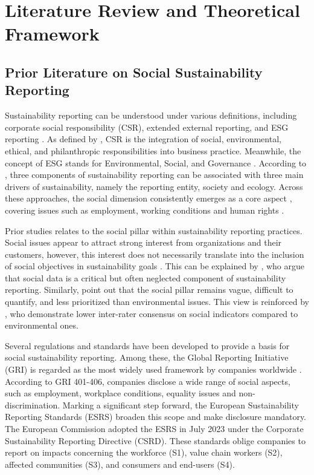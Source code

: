 \chapter{Literature Review and Theoretical Framework}
\label{chap:background}
\section{Prior Literature on Social Sustainability Reporting}

Sustainability reporting can be understood under various definitions, 
including corporate social responsibility (CSR), extended external reporting, 
and ESG reporting \parencite{Edge2022}. As defined by \parencite{Rasche2017}, CSR is the integration of social, 
environmental, ethical, and philanthropic responsibilities into business practice. 
Meanwhile, the concept of ESG stands for Environmental, Social, and Governance \parencite{UNGlobal2004}.
According to \parencite{Krivogorsky2024}, three components of sustainability reporting 
can be associated with three main drivers of sustainability, namely the reporting entity, 
society and ecology. Across these approaches, the social dimension consistently emerges 
as a core aspect \parencite{Rasche2017, UNGlobal2024, Krivogorsky2024}, covering issues 
such as employment, working conditions and human rights \parencite{Fiechter2022, Morais2018}.

Prior studies relates to the social pillar within sustainability reporting practices. Social issues 
appear to attract strong interest from organizations and their customers, however, this interest does 
not necessarily translate into the inclusion of social objectives in sustainability goals \parencite{Heldal2024}. 
This can be explained by \textcite{Sharma2024}, who argue that
social data is a critical but often neglected component of sustainability reporting. Similarly, 
\textcite{Morais2018} point out that the social pillar remains vague, difficult to quantify, 
and less prioritized than environmental issues. This view is reinforced by \textcite{Berg2022}, 
who demonstrate lower inter-rater consensus on social indicators compared to environmental ones.

Several regulations and standards have been developed to provide a basis for social sustainability reporting.
Among these, the Global Reporting Initiative (GRI) is regarded as the most widely used framework 
by companies worldwide \parencite{Bais2024, vanOorschot2024}. 
According to GRI 401-406, companies disclose a wide range of social aspects, such as employment,
workplace conditions, equality issues and non-discrimination.
Marking a significant step forward, the European Sustainability Reporting Standards (ESRS) 
broaden this scope and make disclosure mandatory. The European Commission adopted the ESRS 
in July 2023 under the Corporate Sustainability Reporting Directive (CSRD). These standards 
oblige companies to report on impacts concerning the workforce (S1), value chain workers (S2), 
affected communities (S3), and consumers and end-users (S4).

